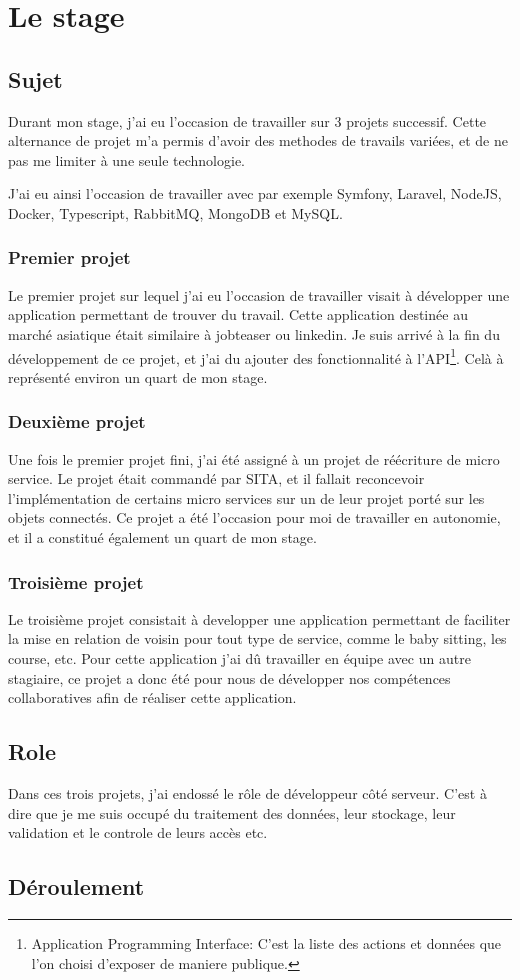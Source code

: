 \documentclass[../rapport.tex]{subfiles}
\begin{document}
    \chapter{Le stage}
    \section{Sujet}
        Durant mon stage, j'ai eu l'occasion de travailler sur 3 projets successif.
        Cette alternance de projet m'a permis d'avoir des methodes de travails variées,
        et de ne pas me limiter à une seule technologie.

        J'ai eu ainsi l'occasion de travailler avec par exemple Symfony,
        Laravel, NodeJS, Docker, Typescript, RabbitMQ, MongoDB et MySQL.

        \subsection{Premier projet}
        Le premier projet sur lequel j'ai eu l'occasion de travailler visait à
        développer une application permettant de trouver du travail. Cette
        application destinée au marché asiatique était similaire à jobteaser ou
        linkedin. Je suis arrivé à la fin du développement de ce projet, et j'ai du 
        ajouter des fonctionnalité à l'API\footnote{Application Programming
        Interface: C'est la liste des actions et données que l'on choisi
        d'exposer de maniere publique.}. Celà à représenté environ un quart de mon
        stage.

        \subsection{Deuxième projet}
        Une fois le premier projet fini, j'ai été assigné à un projet de
        réécriture de micro service. 
        Le projet était commandé par SITA, et il fallait reconcevoir l'implémentation
        de certains micro services sur un de leur projet porté sur les objets
        connectés.
        Ce projet a été l'occasion pour moi de travailler en autonomie, et il a
        constitué également un quart de mon stage.

        \subsection{Troisième projet}
        Le troisième projet consistait à developper une application permettant
        de faciliter la mise en relation de voisin pour tout type de service, comme
        le baby sitting, les course, etc. Pour cette application j'ai dû travailler en
        équipe avec un autre stagiaire, ce projet a donc été pour nous de développer 
        nos compétences collaboratives afin de réaliser cette application.
    \section{Role}
        Dans ces trois projets, j'ai endossé le rôle de développeur côté
        serveur. C'est à dire que je me suis occupé du traitement des données,
        leur stockage, leur validation et le controle de leurs accès etc.
    \section{Déroulement}
         
\end{document}
